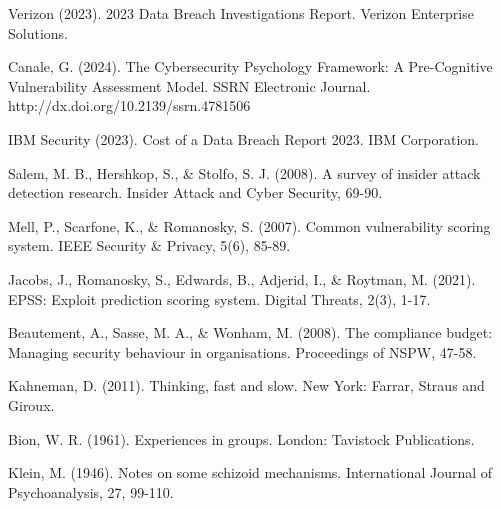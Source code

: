 \documentclass[11pt,a4paper]{article}
\begin{document}
\begin{thebibliography}{99}

Verizon (2023). 2023 Data Breach Investigations Report. Verizon Enterprise Solutions.

Canale, G. (2024). The Cybersecurity Psychology Framework: A Pre-Cognitive Vulnerability Assessment Model. SSRN Electronic Journal. http://dx.doi.org/10.2139/ssrn.4781506

IBM Security (2023). Cost of a Data Breach Report 2023. IBM Corporation.

Salem, M. B., Hershkop, S., \& Stolfo, S. J. (2008). A survey of insider attack detection research. Insider Attack and Cyber Security, 69-90.

Mell, P., Scarfone, K., \& Romanosky, S. (2007). Common vulnerability scoring system. IEEE Security \& Privacy, 5(6), 85-89.

Jacobs, J., Romanosky, S., Edwards, B., Adjerid, I., \& Roytman, M. (2021). EPSS: Exploit prediction scoring system. Digital Threats, 2(3), 1-17.

Beautement, A., Sasse, M. A., \& Wonham, M. (2008). The compliance budget: Managing security behaviour in organisations. Proceedings of NSPW, 47-58.

Kahneman, D. (2011). Thinking, fast and slow. New York: Farrar, Straus and Giroux.

Bion, W. R. (1961). Experiences in groups. London: Tavistock Publications.

Klein, M. (1946). Notes on some schizoid mechanisms. International Journal of Psychoanalysis, 27, 99-110.

\end{thebibliography}
\end{document}
